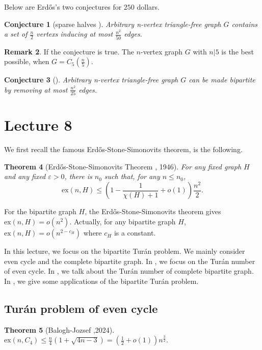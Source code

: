 \documentclass{article}
\newtheorem{theorem}{Theorem}[section]
\newtheorem{conjecture}[theorem]{Conjecture}
\theoremstyle{definition}
\newtheorem{remark}[theorem]{Remark}
\newcommand{\ex}{\mathrm{ex}}
\def\Erdos{Erd\H{o}s}
\def\Turan{Tur\'an}
\renewcommand{\epsilon}{\varepsilon}
\begin{document}
Below are \Erdos{}'s two conjectures for $250$ dollars.
\begin{conjecture}[sparse halves \cite{ERDOS198881}]
    Arbitrary n-vertex triangle-free graph $G$ contains a set of $\frac{n}{2}$ vertexs inducing at most $\frac{n^2}{50}$ edges.
\end{conjecture}
\begin{remark}
If the conjecture is true. The $n$-vertex graph $G$ with $n|5$ is the best possible, when $G = C_5(\frac{n}{5})$.
\end{remark}

\begin{conjecture}[\cite{ERDOS198881}]
    Arbitrary n-vertex triangle-free graph $G$ can be made bipartite by removing at most $\frac{n^2}{25}$ edges.
\end{conjecture}


\newpage
\section{Lecture 8}
We first recall the famous \Erdos{}-Stone-Simonovits theorem, is the following.
\begin{theorem}[\Erdos{}-Stone-Simonovits Theorem \cite{erdos1966limit, erdos1946linear}, 1946]{}{} \label{ESS}
    For any fixed graph $H$ and any fixed $\epsilon >0$, there is $n_0$ such that, for any $n\leq n_0$,
    $$ \ex(n,H)\leq (1-\frac{1}{\chi(H)+1}+o(1))\frac{n^2}{2}.$$
\end{theorem}
For the bipartite graph $H$, the \Erdos{}-Stone-Simonovits theorem gives $\ex(n,H)=o(n^2)$. Actually, for any bipartite graph $H$, $\ex(n,H)=o(n^{2-c_H})$ where $c_H$ is a constant. \par
In this lecture, we focus on the bipartite \Turan{} problem. We mainly consider even cycle and the complete bipartite graph. In , we focus on  the \Turan{} number of even cycle.  In , we talk about the  \Turan{} number of complete bipartite graph. In , we give some applications of the bipartite \Turan{} problem. 


\subsection{\Turan{} problem of even cycle}\label{8.1}

\begin{theorem}[Balogh-Jozsef \cite{MR2680230},2024]\label{c4}
    $\ex(n,C_4)\leq \frac{n}{4}(1+\sqrt{4n-3})=(\frac{1}{2}+o(1))n^{\frac{3}{2}}.$
\end{theorem}
\end{document}
